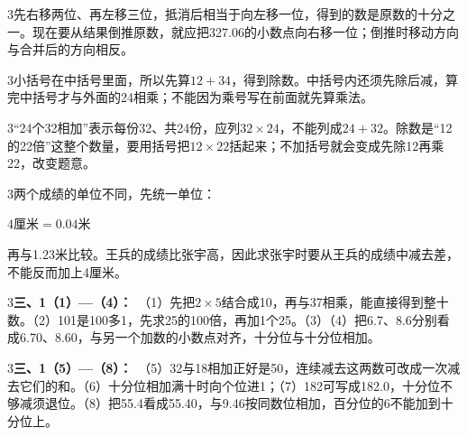 \documentclass[multi=snippet,border={5bp 20bp 5bp 5bp}]{standalone}
\newenvironment{snippet}[3]{\begin{minipage}{#1bp}\color{answerred}\fontsize{#2}{#3}\selectfont\raggedright}{\end{minipage}}
\begin{document}
\begin{snippet}{505}{11.5}{14}\begin{multicols}{3}\raggedcolumns 先右移两位、再左移三位，抵消后相当于向左移一位，得到的数是原数的十分之一。现在要从结果倒推原数，就应把327.06的小数点向右移一位；倒推时移动方向与合并后的方向相反。\end{multicols}\end{snippet}
\begin{snippet}{505}{11.5}{14}\begin{multicols}{3}\raggedcolumns 小括号在中括号里面，所以先算\(12+34\)\allowbreak ，得到除数。中括号内还须先除后减，算完中括号才与外面的24相乘；不能因为乘号写在前面就先算乘法。\end{multicols}\end{snippet}
\begin{snippet}{505}{11.5}{14}\begin{multicols}{3}\raggedcolumns “24个32相加”表示每份32、共24份，应列\(32\times24\)\allowbreak ，不能列成\(24+32\)\allowbreak 。除数是“12的22倍”这整个数量，要用括号把\(12\times22\)\allowbreak 括起来；不加括号就会变成先除12再乘22，改变题意。\end{multicols}\end{snippet}
\begin{snippet}{505}{11.5}{14}\begin{multicols}{3}\raggedcolumns 两个成绩的单位不同，先统一单位：\par\noindent\(\displaystyle 4\text{厘米}=0.04\text{米}\)\allowbreak \par 再与1.23米比较。王兵的成绩比张宇高，因此求张宇时要从王兵的成绩中减去差，不能反而加上4厘米。\end{multicols}\end{snippet}
\begin{snippet}{505}{11.5}{14}\begin{multicols}{3}\raggedcolumns \textbf{三、1（1）—（4）：}\ （1）先把\(2\times5\)\allowbreak 结合成10，再与37相乘，能直接得到整十数。（2）101是100多1，先求25的100倍，再加1个25。（3）（4）把6.7、8.6分别看成6.70、8.60，与另一个加数的小数点对齐，十分位与十分位相加。\end{multicols}\end{snippet}
\begin{snippet}{505}{11.5}{14}\begin{multicols}{3}\raggedcolumns \textbf{三、1（5）—（8）：}\ （5）32与18相加正好是50，连续减去这两数可改成一次减去它们的和。（6）十分位相加满十时向个位进1；（7）182可写成182.0，十分位不够减须退位。（8）把55.4看成55.40，与9.46按同数位相加，百分位的6不能加到十分位上。\end{multicols}\end{snippet}
\end{document}
